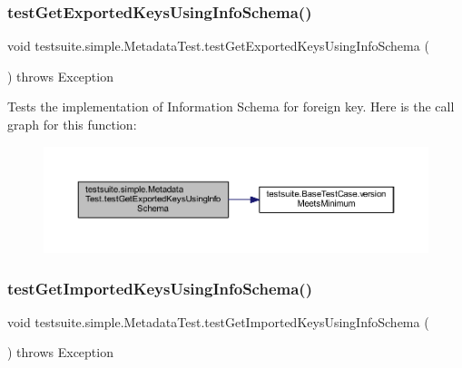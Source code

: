 \subsubsection{\texorpdfstring{test\+Get\+Exported\+Keys\+Using\+Info\+Schema()}{testGetExportedKeysUsingInfoSchema()}}
{\footnotesize\ttfamily void testsuite.\+simple.\+Metadata\+Test.\+test\+Get\+Exported\+Keys\+Using\+Info\+Schema (\begin{DoxyParamCaption}{ }\end{DoxyParamCaption}) throws Exception}

Tests the implementation of Information Schema for foreign key. Here is the call graph for this function\+:
\nopagebreak
\begin{figure}[H]
\begin{center}
\leavevmode
\includegraphics[width=350pt]{classtestsuite_1_1simple_1_1_metadata_test_ae23d4ce9f6bff53b3ea3033d6a7f82a7_cgraph}
\end{center}
\end{figure}
\mbox{\label{classtestsuite_1_1simple_1_1_metadata_test_aaef304b87a16efa2655e6e93ca030117}} 
\subsubsection{\texorpdfstring{test\+Get\+Imported\+Keys\+Using\+Info\+Schema()}{testGetImportedKeysUsingInfoSchema()}}
{\footnotesize\ttfamily void testsuite.\+simple.\+Metadata\+Test.\+test\+Get\+Imported\+Keys\+Using\+Info\+Schema (\begin{DoxyParamCaption}{ }\end{DoxyParamCaption}) throws Exception}

